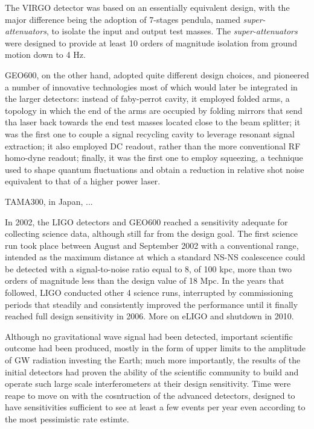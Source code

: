 The VIRGO detector was based on an essentially equivalent design, with the major difference being the adoption of 7-stages pendula, named \textit{super-attenuators}, to isolate the input and output test masses. The \textit{super-attenuators} were designed to provide at least 10 orders of magnitude isolation from ground motion down to 4 Hz.

GEO600, on the other hand, adopted quite different design choices, and pioneered a number of innovative technologies most of which would later be integrated in the larger detectors: instead of faby-perrot cavity, it employed folded arms, a topology in which the end of the arms are occupied by folding mirrors that send tha laser back towards the end test masses located close to the beam splitter; it was the first one to couple a signal recycling cavity to leverage resonant signal extraction; it also employed DC readout, rather than the more conventional RF homo-dyne readout; finally, it was the first one to employ squeezing, a technique used to shape quantum fluctuations and obtain a reduction in relative shot noise equivalent to that of a higher power laser.

TAMA300, in Japan, ...

In 2002, the LIGO detectors and GEO600 reached a sensitivity adequate for collecting science data, although still far from the design goal. 
The first science run took place between August and September 2002 with a conventional range, intended as the maximum distance at which a standard NS-NS coalescence could be detected with a signal-to-noise ratio equal to 8, of 100 kpc, more than two orders of magnitude less than the design value of 18 Mpc. In the years that followed, LIGO conducted other 4 science runs, interrupted by commissioning periods that steadily and consistently improved the performance until it finally reached full design sensitivity in 2006. More on eLIGO and shutdown in 2010.

Although no gravitational wave signal had been detected, important scientific outcome had been produced, mostly in the form of upper limits to the amplitude of GW radiation investing the Earth; much more importantly, the results of the initial detectors had proven the ability of the scientific community to build and operate such large scale interferometers at their design sensitivity. Time were reape to move on with the cosntruction of the advanced detectors, designed to have sensitivities sufficient to see at least a few events per year even according to the most pessimistic rate estimte.

